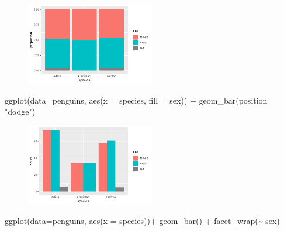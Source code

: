 \documentclass[
  letterpaper,
  DIV=11,
  numbers=noendperiod]{scrreprt}
\newenvironment{Shaded}{\begin{snugshade}}{\end{snugshade}}
\newcommand{\AttributeTok}[1]{\textcolor[rgb]{0.40,0.45,0.13}{#1}}
\newcommand{\FunctionTok}[1]{\textcolor[rgb]{0.28,0.35,0.67}{#1}}
\newcommand{\NormalTok}[1]{\textcolor[rgb]{0.00,0.23,0.31}{#1}}
\newcommand{\SpecialCharTok}[1]{\textcolor[rgb]{0.37,0.37,0.37}{#1}}
\newcommand{\StringTok}[1]{\textcolor[rgb]{0.13,0.47,0.30}{#1}}
\begin{document}
\begin{tcolorbox}[enhanced jigsaw, breakable, colback=white, bottomrule=.15mm, leftrule=.75mm, colframe=quarto-callout-note-color-frame, arc=.35mm, rightrule=.15mm, toprule=.15mm, left=2mm, opacityback=0]
\begin{figure}[H]
{\centering \includegraphics[width=0.5\textwidth,height=\textheight]{05-content_files/figure-pdf/proportion-barplot-1.pdf}

}

\end{figure}

\begin{Shaded}
\begin{Highlighting}[]
\FunctionTok{ggplot}\NormalTok{(}\AttributeTok{data=}\NormalTok{penguins, }\FunctionTok{aes}\NormalTok{(}\AttributeTok{x =}\NormalTok{ species, }\AttributeTok{fill =}\NormalTok{ sex)) }\SpecialCharTok{+}
  \FunctionTok{geom\_bar}\NormalTok{(}\AttributeTok{position =} \StringTok{"dodge"}\NormalTok{)}
\end{Highlighting}
\end{Shaded}

\begin{figure}[H]

{\centering \includegraphics[width=0.5\textwidth,height=\textheight]{05-content_files/figure-pdf/side-by-side-barplot-1.pdf}

}

\end{figure}

\begin{Shaded}
\begin{Highlighting}[]
\FunctionTok{ggplot}\NormalTok{(}\AttributeTok{data=}\NormalTok{penguins, }\FunctionTok{aes}\NormalTok{(}\AttributeTok{x =}\NormalTok{ species))}\SpecialCharTok{+}
  \FunctionTok{geom\_bar}\NormalTok{() }\SpecialCharTok{+}
  \FunctionTok{facet\_wrap}\NormalTok{(}\SpecialCharTok{\textasciitilde{}}\NormalTok{ sex)}
\end{Highlighting}
\end{Shaded}


\end{tcolorbox}
\end{document}
